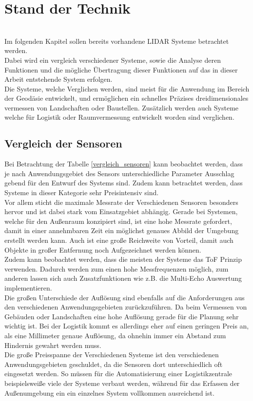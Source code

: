 \chapter{Stand der Technik}\label{chap:stand_der_technik}
\\
Im folgenden Kapitel sollen bereits vorhandene \ac{LIDAR} Systeme betrachtet werden.\\
Dabei wird ein vergleich verschiedener Systeme, sowie die Analyse deren Funktionen und die mögliche Übertragung dieser Funktionen auf das in dieser Arbeit entstehende System erfolgen.\\
Die Systeme, welche Verglichen werden, sind meist für die Anwendung im Bereich der Geodäsie entwickelt, und ermöglichen ein schnelles Präzises dreidimensionales vermessen von Landschaften oder Baustellen. Zusätzlich werden auch Systeme welche für Logistik oder Raumvermessung entwickelt worden sind verglichen. \\

\section{Vergleich der Sensoren}
Bei Betrachtung der Tabelle \ref{vergleich_sensoren} kann beobachtet werden, dass je nach Anwendungsgebiet des Sensors unterschiedliche Parameter Ausschlag gebend für den Entwurf des Systems sind. Zudem kann betrachtet werden, dass Systeme in dieser Kategorie sehr Preisintensiv sind. \\
Vor allem sticht die maximale Messrate der Verschiedenen Sensoren besonders hervor und ist dabei stark vom Einsatzgebiet abhängig. Gerade bei Systemen, welche für den Außenraum konzipiert sind, ist eine hohe Messrate gefordert, damit in einer annehmbaren Zeit ein möglichst genaues Abbild der Umgebung erstellt werden kann. Auch ist eine große Reichweite von Vorteil, damit auch Objekte in großer Entfernung noch Aufgezeichnet werden können. \\
Zudem kann beobachtet werden, dass die meisten der Systeme das \ac{ToF} Prinzip verwenden. Dadurch werden zum einen hohe Messfrequenzen möglich, zum anderen lassen sich auch Zusatzfunktionen wie z.B. die Multi-Echo Auswertung implementieren. \\
Die großen Unterschiede der Auflösung sind ebenfalls auf die Anforderungen aus den verschiedenen Anwendungsgebieten zurückzuführen. Da beim Vermessen von Gebäuden oder Landschaften eine hohe Auflösung gerade für die Planung sehr wichtig ist. Bei der Logistik kommt es allerdings eher auf einen geringen Preis an, als eine Millimeter genaue Auflösung, da ohnehin immer ein Abstand zum Hindernis gewahrt werden muss.\\
Die große Preisspanne der Verschiedenen Systeme ist den verschiedenen Anwendungsgebieten geschuldet, da die Sensoren dort unterschiedlich oft eingesetzt werden. So müssen für die Automatisierung einer Logistikzentrale beispielsweiße viele der Systeme verbaut werden, während für das Erfassen der Außenumgebung ein ein einzelnes System vollkommen ausreichend ist.

